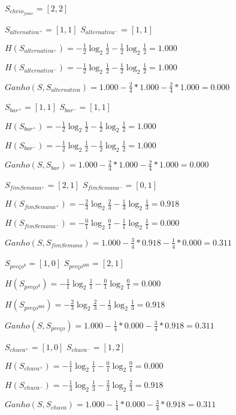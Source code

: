 
\par $S_{cheio_{fome}} = [2,2]$

\vskip 0.3in
\par $S_{alternativa^{+}} = [1,1]$ \qquad $S_{alternativa^{-}} = [1,1]$
\par $H(S_{alternativa^{+}}) = -\frac{1}{2} \log_2 \frac{1}{2}- \frac{1}{2} \log_2 \frac{1}{2} = 1.000$
\par $H(S_{alternativa^{-}}) = -\frac{1}{2} \log_2 \frac{1}{2}- \frac{1}{2} \log_2 \frac{1}{2} = 1.000$
\par $Ganho(S, S_{alternativa}) = 1.000-\frac{2}{4} * 1.000-\frac{2}{4} * 1.000 = 0.000$

\vskip 0.3in
\par $S_{bar^{+}} = [1,1]$ \qquad $S_{bar^{-}} = [1,1]$
\par $H(S_{bar^{+}}) = -\frac{1}{2} \log_2 \frac{1}{2}- \frac{1}{2} \log_2 \frac{1}{2} = 1.000$
\par $H(S_{bar^{-}}) = -\frac{1}{2} \log_2 \frac{1}{2}- \frac{1}{2} \log_2 \frac{1}{2} = 1.000$
\par $Ganho(S, S_{bar}) = 1.000-\frac{2}{4} * 1.000-\frac{2}{4} * 1.000 = 0.000$

\vskip 0.3in
\par $S_{fimSemana^{+}} = [2,1]$ \qquad $S_{fimSemana^{-}} = [0,1]$
\par $H(S_{fimSemana^{+}}) = -\frac{2}{3} \log_2 \frac{2}{3}- \frac{1}{3} \log_2 \frac{1}{3} = 0.918$
\par $H(S_{fimSemana^{-}}) = -\frac{0}{1} \log_2 \frac{0}{1}- \frac{1}{1} \log_2 \frac{1}{1} = 0.000$
\par $Ganho(S, S_{fimSemana}) = 1.000-\frac{3}{4} * 0.918-\frac{1}{4} * 0.000 = 0.311$

\vskip 0.3in
\par $S_{preço^{\$}} = [1,0]$ \qquad $S_{preço^{\$\$\$}} = [2,1]$
\par $H(S_{preço^{\$}}) = -\frac{1}{1} \log_2 \frac{1}{1}- \frac{0}{1} \log_2 \frac{0}{1} = 0.000$
\par $H(S_{preço^{\$\$\$}}) = -\frac{2}{3} \log_2 \frac{2}{3}- \frac{1}{3} \log_2 \frac{1}{3} = 0.918$
\par $Ganho(S, S_{preço}) = 1.000-\frac{1}{4} * 0.000-\frac{3}{4} * 0.918 = 0.311$

\vskip 0.3in
\par $S_{chuva^{+}} = [1,0]$ \qquad $S_{chuva^{-}} = [1,2]$
\par $H(S_{chuva^{+}}) = -\frac{1}{1} \log_2 \frac{1}{1}- \frac{0}{1} \log_2 \frac{0}{1} = 0.000$
\par $H(S_{chuva^{-}}) = -\frac{1}{3} \log_2 \frac{1}{3}- \frac{2}{3} \log_2 \frac{2}{3} = 0.918$
\par $Ganho(S, S_{chuva}) = 1.000-\frac{1}{4} * 0.000-\frac{3}{4} * 0.918 = 0.311$

